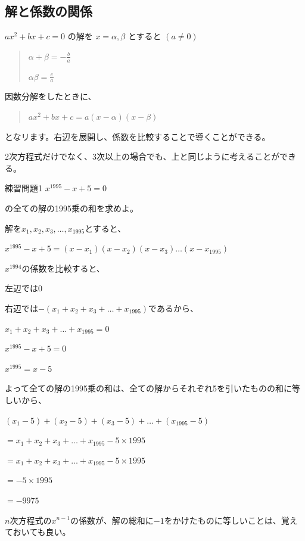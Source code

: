 \documentclass[uplatex,fleqn]{jsbook}
\begin{document}
\subsection{解と係数の関係}

$ax^2+bx+c=0$
の解を
$x=\alpha,\beta$
とすると
$\left(a\neq0\right)$
\begin{quote}
    $\displaystyle \alpha+\beta=-\frac{b}{a}$

    $\displaystyle \alpha\beta=\frac{c}{a}$
\end{quote}
因数分解をしたときに、
\begin{quote}
    $ax^2+bx+c=a\left(x-\alpha\right)\left(x-\beta\right)$
\end{quote}
となリます。右辺を展開し、係数を比較することで導くことができる。

2次方程式だけでなく、3次以上の場合でも、上と同じように考えることができる。

\begin{problem}{練習問題1}
    $x^{1995}-x+5=0$

    の全ての解の1995乗の和を求めよ。
\end{problem}

\begin{answer}
    解を$x_1,x_2,x_3,\dots,x_{1995}$とすると、

    $x^{1995}-x+5=\left(x-x_1\right)\left(x-x_2\right)\left(x-x_3\right)\dots \left(x-x_{1995}\right)$

    $x^{1994}$の係数を比較すると、

    左辺では$0$

    右辺では$-\left(x_1+x_2+x_3+\dots +x_{1995}\right)$であるから、

    $x_1+x_2+x_3+\dots +x_{1995}=0$

    $x^{1995}-x+5=0$

    $x^{1995}=x-5$

    よって全ての解の1995乗の和は、全ての解からそれぞれ5を引いたものの和に等しいから、

    $\left(x_1-5\right)+\left(x_2-5\right)+\left(x_3-5\right)+\dots +\left(x_{1995}-5\right)$

    $=x_1+x_2+x_3+\dots +x_{1995}-5\times 1995$

    $=x_1+x_2+x_3+\dots +x_{1995}-5\times 1995$

    $=-5\times 1995$

    $=-9975$
\end{answer}
$n$次方程式の$x^{n-1}$の係数が、解の総和に$-1$をかけたものに等しいことは、覚えておいても良い。
\end{document}
